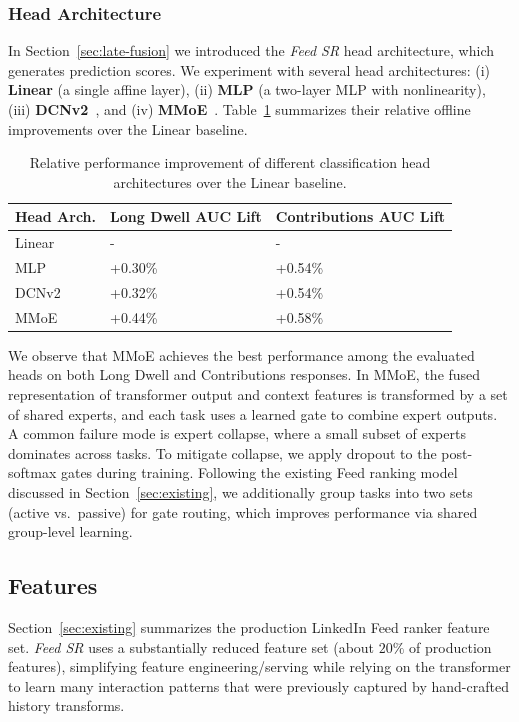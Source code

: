 \documentclass[sigconf]{acmart}
\newcommand{\systemname}{\textit{Feed SR}}
\begin{document}
\subsubsection{Head Architecture}\label{sec:head-arch}
In Section~\ref{sec:late-fusion} we introduced the {\systemname} head architecture, which generates prediction scores. We experiment with several head architectures: (i) \textbf{Linear} (a single affine layer), (ii) \textbf{MLP} (a two-layer MLP with nonlinearity), (iii) \textbf{DCNv2}~\cite{wang2021dcn}, and (iv) \textbf{MMoE}~\cite{ma2018modeling}. Table~\ref{tab:headarch} summarizes their relative offline improvements over the Linear baseline.

\begin{table}[htbp]
\centering
\begin{tabular}{@{}lll@{}}
\toprule
Head Arch. & Long Dwell AUC Lift & Contributions AUC Lift \\ \midrule
Linear        &  -        &  -        \\
MLP           & +0.30\%   & +0.54\%   \\
DCNv2         & +0.32\%   & +0.54\%   \\
MMoE          & +0.44\%   & +0.58\%   \\ \bottomrule
\end{tabular}
\caption{Relative performance improvement of different classification head architectures over the Linear baseline.}
\label{tab:headarch}
\vspace{-2.5em}
\end{table}


We observe that MMoE achieves the best performance among the evaluated heads on both Long Dwell and Contributions responses. In MMoE, the fused representation of transformer output and context features is transformed by a set of shared experts, and each task uses a learned gate to combine expert outputs. A common failure mode is expert collapse, where a small subset of experts dominates across tasks. To mitigate collapse, we apply dropout to the post-softmax gates during training. Following the existing Feed ranking model discussed in Section~\ref{sec:existing}, we additionally group tasks into two sets (active vs.\ passive) for gate routing, which improves performance via shared group-level learning. 


\subsection{Features}\label{sec:features}
Section~\ref{sec:existing} summarizes the production LinkedIn Feed ranker feature set. {\systemname} uses a substantially reduced feature set (about $20\%$ of production features), simplifying feature engineering/serving while relying on the transformer to learn many interaction patterns that were previously captured by hand-crafted history transforms.
\end{document}
